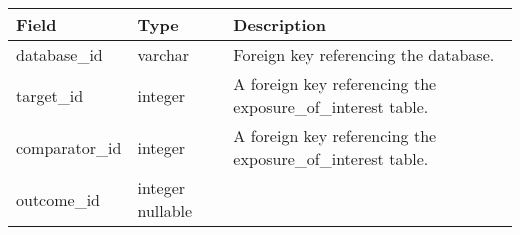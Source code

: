 \documentclass[
]{article}
\begin{document}
\begin{longtable}[]{@{}lll@{}}
\toprule
\begin{minipage}[b]{0.23\columnwidth}\raggedright
Field\strut
\end{minipage} & \begin{minipage}[b]{0.18\columnwidth}\raggedright
Type\strut
\end{minipage} & \begin{minipage}[b]{0.50\columnwidth}\raggedright
Description\strut
\end{minipage}\tabularnewline
\midrule
\endhead
\begin{minipage}[t]{0.23\columnwidth}\raggedright
database\_id\strut
\end{minipage} & \begin{minipage}[t]{0.18\columnwidth}\raggedright
varchar\strut
\end{minipage} & \begin{minipage}[t]{0.50\columnwidth}\raggedright
Foreign key referencing the database.\strut
\end{minipage}\tabularnewline
\begin{minipage}[t]{0.23\columnwidth}\raggedright
target\_id\strut
\end{minipage} & \begin{minipage}[t]{0.18\columnwidth}\raggedright
integer\strut
\end{minipage} & \begin{minipage}[t]{0.50\columnwidth}\raggedright
A foreign key referencing the exposure\_of\_interest table.\strut
\end{minipage}\tabularnewline
\begin{minipage}[t]{0.23\columnwidth}\raggedright
comparator\_id\strut
\end{minipage} & \begin{minipage}[t]{0.18\columnwidth}\raggedright
integer\strut
\end{minipage} & \begin{minipage}[t]{0.50\columnwidth}\raggedright
A foreign key referencing the exposure\_of\_interest table.\strut
\end{minipage}\tabularnewline
\begin{minipage}[t]{0.23\columnwidth}\raggedright
outcome\_id\strut
\end{minipage} & \begin{minipage}[t]{0.18\columnwidth}\raggedright
integer nullable\strut
\end{minipage} & \begin{minipage}[t]{0.50\columnwidth}\raggedright

\end{minipage}
\end{longtable}
\end{document}
